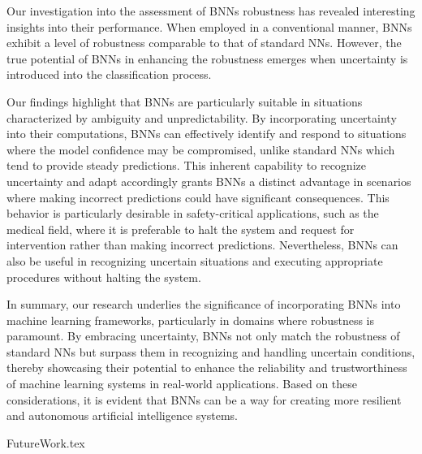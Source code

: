 \documentclass[
	12pt,
	a4paper,
	cleardoublepage=empty,
	headings=twolinechapter,
	numbers=autoenddot,
]{scrbook}
\begin{document}
	Our investigation into the assessment of BNNs robustness has revealed interesting insights into their performance. When employed in a conventional manner, BNNs exhibit a level of robustness comparable to that of standard NNs. However, the true potential of BNNs in enhancing the robustness emerges when uncertainty is introduced into the classification process.
	
	Our findings highlight that BNNs are particularly suitable in situations characterized by ambiguity and unpredictability. By incorporating uncertainty into their computations, BNNs can effectively identify and respond to situations where the model confidence may be compromised, unlike standard NNs which tend to provide steady predictions. This inherent capability to recognize uncertainty and adapt accordingly grants BNNs a distinct advantage in scenarios where making incorrect predictions could have significant consequences. This behavior is particularly desirable in safety-critical applications, such as the medical field, where it is preferable to halt the system and request for intervention rather than making incorrect predictions. Nevertheless, BNNs can also be useful in recognizing uncertain situations and executing appropriate procedures without halting the system.
	
	In summary, our research underlies the significance of incorporating BNNs into machine learning frameworks, particularly in domains where robustness is paramount. By embracing uncertainty, BNNs not only match the robustness of standard NNs but surpass them in recognizing and handling uncertain conditions, thereby showcasing their potential to enhance the reliability and trustworthiness of machine learning systems in real-world applications. Based on these considerations, it is evident that BNNs can be a way for creating more resilient and autonomous artificial intelligence systems.
	
	{FutureWork.tex}
	
	
	
	
	
	
\end{document}
